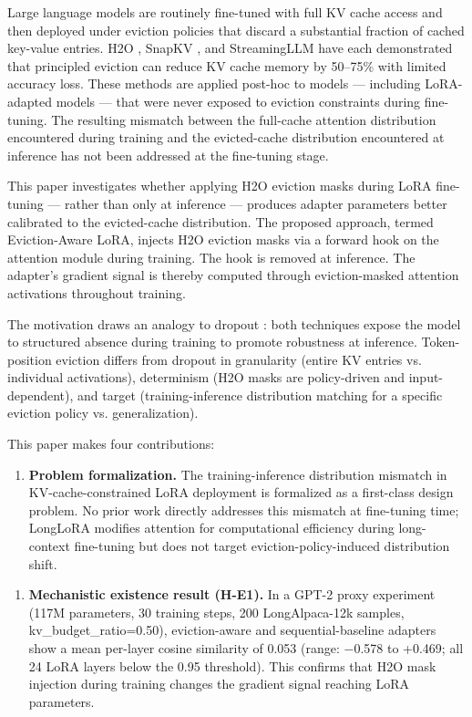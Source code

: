 
Large language models are routinely fine-tuned with full KV cache access and then deployed under eviction policies that discard a substantial fraction of cached key-value entries. H2O \citep{Zhangetal2023}, SnapKV \citep{Lietal2024}, and StreamingLLM \citep{Xiaoetal2023} have each demonstrated that principled eviction can reduce KV cache memory by 50–75\% with limited accuracy loss. These methods are applied post-hoc to models — including LoRA-adapted models — that were never exposed to eviction constraints during fine-tuning. The resulting mismatch between the full-cache attention distribution encountered during training and the evicted-cache distribution encountered at inference has not been addressed at the fine-tuning stage.

This paper investigates whether applying H2O eviction masks during LoRA fine-tuning — rather than only at inference — produces adapter parameters better calibrated to the evicted-cache distribution. The proposed approach, termed Eviction-Aware LoRA, injects H2O eviction masks via a forward hook on the attention module during training. The hook is removed at inference. The adapter's gradient signal is thereby computed through eviction-masked attention activations throughout training.

The motivation draws an analogy to dropout \citep{Srivastavaetal2014}: both techniques expose the model to structured absence during training to promote robustness at inference. Token-position eviction differs from dropout in granularity (entire KV entries vs. individual activations), determinism (H2O masks are policy-driven and input-dependent), and target (training-inference distribution matching for a specific eviction policy vs. generalization).

This paper makes four contributions:

\begin{enumerate}
\item \textbf{Problem formalization.} The training-inference distribution mismatch in KV-cache-constrained LoRA deployment is formalized as a first-class design problem. No prior work directly addresses this mismatch at fine-tuning time; LongLoRA \citep{Chenetal2023} modifies attention for computational efficiency during long-context fine-tuning but does not target eviction-policy-induced distribution shift.
\end{enumerate}

\begin{enumerate}
\item \textbf{Mechanistic existence result (H-E1).} In a GPT-2 proxy experiment (117M parameters, 30 training steps, 200 LongAlpaca-12k samples, kv_budget_ratio=0.50), eviction-aware and sequential-baseline adapters show a mean per-layer cosine similarity of 0.053 (range: −0.578 to +0.469; all 24 LoRA layers below the 0.95 threshold). This confirms that H2O mask injection during training changes the gradient signal reaching LoRA parameters.
\end{enumerate}

